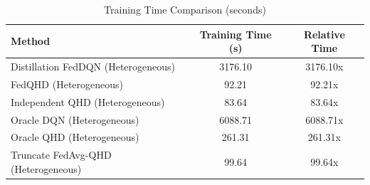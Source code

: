 \begin{table}[t]
\centering
\caption{Training Time Comparison (seconds)}
\label{tab:computation_cost}
\begin{tabular}{lcc}
\toprule
Method & Training Time (s) & Relative Time \\
\midrule
Distillation FedDQN (Heterogeneous) & 3176.10 & 3176.10x \\
FedQHD (Heterogeneous) & 92.21 & 92.21x \\
Independent QHD (Heterogeneous) & 83.64 & 83.64x \\
Oracle DQN (Heterogeneous) & 6088.71 & 6088.71x \\
Oracle QHD (Heterogeneous) & 261.31 & 261.31x \\
Truncate FedAvg-QHD (Heterogeneous) & 99.64 & 99.64x \\
\bottomrule
\end{tabular}
\end{table}